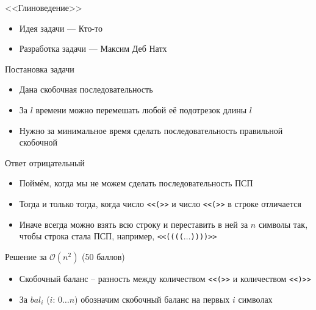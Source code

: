 \begin{frame}
  \begin{center}
    \LARGE <<Глиноведение>>
  \end{center}

  \begin{itemize}
  \item Идея задачи --- Кто-то
  \item Разработка задачи --- Максим Деб Натх
  \end{itemize}

\end{frame}

\begin{frame}{Постановка задачи}

  \begin{itemize}
  \item Дана скобочная последовательность
  \item За $l$ времени можно перемешать любой её подотрезок длины $l$
  \item Нужно за минимальное время сделать последовательность правильной скобочной
  \end{itemize}
  
\end{frame}

\begin{frame}{Ответ отрицательный}
  \begin{itemize}
  \item Поймём, когда мы не можем сделать последовательность ПСП
  \item Тогда и только тогда, когда число \texttt{<<(>>} и число \texttt{<<(>>} в строке отличается
  \item Иначе всегда можно взять всю строку и переставить в ней за $n$ символы так, чтобы строка стала ПСП, например, \texttt{<<(((($\dots$))))>>}
  \end{itemize}
\end{frame}

\begin{frame}{Решение за $\mathcal{O}(n^2)$ (50 баллов)}
  \begin{itemize}
  \item Скобочный баланс -- разность между количеством \texttt{<<(>>} и количеством \texttt{<<)>>}
  \item За $bal_i$ ($i:\,0\dots n$) обозначим скобочный баланс на первых $i$ символах
  \end{itemize}
\end{frame}

